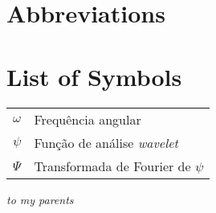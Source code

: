 \documentclass[11pt,oneside,a4paper]{book}
\begin{document}

\chapter*{Abbreviations}

\chapter*{List of Symbols}
\begin{tabular}{ll}
        $\omega$    & Frequência angular\\
        $\psi$      & Função de análise \emph{wavelet}\\
        $\Psi$      & Transformada de Fourier de $\psi$\\
\end{tabular}

\clearpage
\thispagestyle{empty}
\pagestyle{empty} %
\vspace*{\fill}
\begin{center}
{\Large\it to my parents}
\end{center}
\vspace*{\fill}

\mainmatter %
\pagestyle{fancy}
\setlength{\parskip}{0.5\baselineskip} %
\linenumbers
 
 
\nolinenumbers

\backmatter
\nocite{*}


\end{document}
